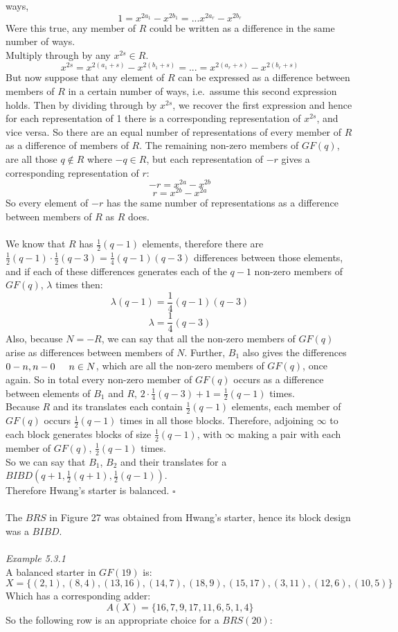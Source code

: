 \documentclass[
  12pt,
  a4paper]{book}
\begin{document}
ways, \[1 = x^{2a_1}-x^{2b_1}=...x^{2a_r}-x^{2b_r}\] Were this true, any
member of \(R\) could be written as a difference in the same number of
ways.\\
Multiply through by any \(x^{2s} \in R\).
\[x^{2s} = x^{2(a_1+s)}-x^{2(b_1+s)}=...=x^{2(a_r+s)}-x^{2(b_r+s)}\] But
now suppose that any element of \(R\) can be expressed as a difference
between members of \(R\) in a certain number of ways, i.e.~assume this
second expression holds. Then by dividing through by \(x^{2s}\), we
recover the first expression and hence for each representation of 1
there is a corresponding representation of \(x^{2s}\), and vice versa.
So there are an equal number of representations of every member of \(R\)
as a difference of members of \(R\). The remaining non-zero members of
\(GF(q)\), are all those \(q \notin R\) where \(-q \in R\), but each
representation of \(-r\) gives a corresponding representation of \(r\):
\[-r=x^{2a}-x^{2b}\] \[r = x^{2b} - x^{2a}\] So every element of \(-r\)
has the same number of representations as a difference between members
of \(R\) as \(R\) does.\\
~\\
We know that \(R\) has \(\frac{1}{2}(q-1)\) elements, therefore there
are\\
\(\frac{1}{2}(q-1) \cdot \frac{1}{2} (q-3) = \frac{1}{4}(q-1)(q-3)\)
differences between those elements, and if each of these differences
generates each of the \(q-1\) non-zero members of \(GF(q)\), \(\lambda\)
times then: \[\lambda(q-1)=\frac{1}{4}(q-1)(q-3)\]
\[\lambda=\frac{1}{4}(q-3)\] Also, because \(N=-R\), we can say that all
the non-zero members of \(GF(q)\) arise as differences between members
of \(N\). Further, \(B_1\) also gives the differences
\(0-n,n-0 \hspace{0.5cm} n\in N\), which are all the non-zero members of
\(GF(q)\), once again. So in total every non-zero member of \(GF(q)\)
occurs as a difference between elements of \(B_1\) and \(R\),
\(2 \cdot \frac{1}{4} (q-3) + 1 = \frac{1}{2} (q-1)\) times.\\
Because \(R\) and its translates each contain \(\frac{1}{2}(q-1)\)
elements, each member of \(GF(q)\) occurs \(\frac{1}{2}(q-1)\) times in
all those blocks. Therefore, adjoining \(\infty\) to each block
generates blocks of size \(\frac{1}{2}(q-1)\), with \(\infty\) making a
pair with each member of \(GF(q)\), \(\frac{1}{2}(q-1)\) times.\\
So we can say that \(B_1\), \(B_2\) and their translates for a
\(BIBD(q+1,\frac{1}{2}(q+1), \frac{1}{2}(q-1))\).\\
Therefore Hwang's starter is balanced. \(\square\)\\
~\\
The \(BRS\) in Figure 27 was obtained from Hwang's starter, hence its
block design was a \(BIBD\).\\
~\\
\emph{Example 5.3.1}\\
A balanced starter in \(GF(19)\) is:
\[X = \{(2,1),(8,4),(13,16),(14,7),(18,9),(15,17),(3,11),(12,6),(10,5)\}\]
Which has a corresponding adder: \[A(X) = \{16,7,9,17,11,6,5,1,4\}\] So
the following row is an appropriate choice for a \(BRS(20)\):
\end{document}
